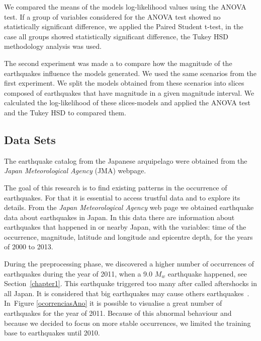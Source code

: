 We compared the means of the models log-likelihood values using the
ANOVA test. If a group of variables considered for the ANOVA test
showed no statistically significant difference, we applied the Paired
Student t-test, in the case all groups showed statistically
significant difference, the Tukey HSD methodology analysis was used.


The second experiment was made a to compare how the magnitude of the
earthquakes influence the models generated. We used the same scenarios
from the first experiment. We split the models obtained from these
scenarios into slices composed of earthquakes that have magnitude in a
given magnitude interval. We calculated the log-likelihood of these
slices-models and applied the ANOVA test and the Tukey HSD to compared
them.






\subsection{Data Sets}

The earthquake catalog from the Japanese arquipelago were obtained
from the \emph{Japan Meteorological Agency} (JMA) webpage.





The goal of this research is to find existing patterns in the
occurrence of earthquakes. For that it is essential to access trustful
data and to explore its details. From the {\it Japan Meteorological
  Agency} web page we obtained earthquake data about earthquakes in
Japan. In this data there are information about earthquakes that
happened in or nearby Japan, with the variables: time of the
occurrence, magnitude, latitude and longitude and epicentre depth, for
the years of 2000 to 2013.

During the preprocessing phase, we discovered a higher number of
occurrences of earthquakes during the year of 2011, when a 9.0 $M_w$
earthquake happened, see Section~\ref{chapter1}. This earthquake
triggered too many after called aftershocks in all Japan. It is
considered that big earthquakes may cause others
earthquakes~\cite{zhuang2004analyzing}. In~Figure \ref{ocorrenciasAno}
it is possible to visualise a great number of earthquakes for the year
of 2011. Because of this abnormal behaviour and because we decided to
focus on more stable occurrences, we limited the training base to
earthquakes until 2010.

